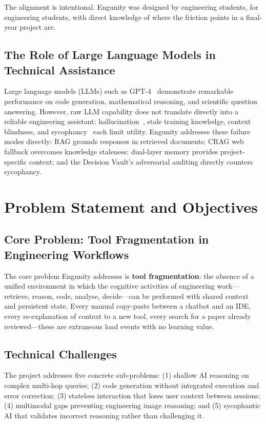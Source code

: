 The alignment is intentional. Engunity was designed by engineering students, for engineering students, with direct knowledge of where the friction points in a final-year project are.

\subsection{The Role of Large Language Models in Technical Assistance}
\label{subsec:llm-role}

Large language models (LLMs) such as GPT-4~\citep{openai2023gpt4} demonstrate remarkable performance on code generation, mathematical reasoning, and scientific question answering. However, raw LLM capability does not translate directly into a reliable engineering assistant: hallucination~\citep{ji2023survey}, stale training knowledge, context blindness, and sycophancy~\citep{perez2022sycophancy} each limit utility. Engunity addresses these failure modes directly: RAG grounds responses in retrieved documents; CRAG web fallback overcomes knowledge staleness; dual-layer memory provides project-specific context; and the Decision Vault's adversarial auditing directly counters sycophancy.

\section{Problem Statement and Objectives}
\label{sec:problem}

\subsection{Core Problem: Tool Fragmentation in Engineering Workflows}
\label{subsec:fragmentation}

The core problem Engunity addresses is \textbf{tool fragmentation}: the absence of a unified environment in which the cognitive activities of engineering work---retrieve, reason, code, analyse, decide---can be performed with shared context and persistent state. Every manual copy-paste between a chatbot and an IDE, every re-explanation of context to a new tool, every search for a paper already reviewed---these are extraneous load events with no learning value.

\subsection{Technical Challenges}
\label{subsec:challenges}

The project addresses five concrete sub-problems: (1) shallow AI reasoning on complex multi-hop queries; (2) code generation without integrated execution and error correction; (3) stateless interaction that loses user context between sessions; (4) multimodal gaps preventing engineering image reasoning; and (5) sycophantic AI that validates incorrect reasoning rather than challenging it.

